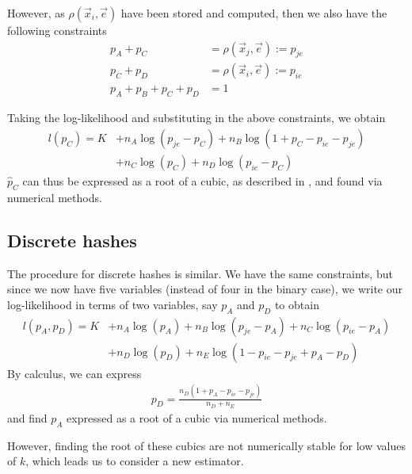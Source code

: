 \documentclass[runningheads]{llncs}
\begin{document}
However, as $\rho(\vec{x}_i, \vec{e})$ have been stored and computed, then we also have the following constraints
\begin{align}
p_A + p_C &= \rho(\vec{x}_j, \vec{e}) := p_{je} \label{cs1} \\
p_C + p_D &= \rho(\vec{x}_i, \vec{e}) := p_{ie} \label{cs2} \\
p_A + p_B + p_C + p_D &= 1 \label{cs3}
\end{align}
        
        Taking the log-likelihood and substituting in the above constraints, we obtain
\begin{equation}
        \begin{split}
        l(p_C) = K &+ n_A \log(p_{je} - p_C) + n_B \log(1 + p_C - p_{ie} - p_{je}) \\
        &+ n_C \log(p_C) + n_D \log(p_{ie} - p_C) \label{binary_cubic}
        \end{split}
\end{equation}
$\hat{p}_C$ can thus be expressed as a root of a cubic, as described in \cite{kang2018improving}, and found via numerical methods.

\subsection{Discrete hashes}
        The procedure for discrete hashes is similar. We have the same constraints, but since we now have five variables (instead of four in the binary case), we write our log-likelihood in terms of two variables, say $p_A$ and $p_D$ to obtain
        \begin{equation}
        \begin{split}
            l(p_A, p_D) = K &+ n_A \log(p_A) + n_B \log(p_{je}-p_A) + n_C \log(p_{ie} - p_A) \\
            &+ n_D \log(p_D) + n_E \log(1 - p_{ie} - p_{je} + p_A - p_D)
        \end{split} \label{discrete_cubic}
        \end{equation}
By calculus, we can express
\begin{align}
        p_D = \frac{n_D(1 + p_A - p_{ie} - p_{je})}{n_D + n_E}
\end{align}
and find $p_A$ expressed as a root of a cubic via numerical methods.

However, finding the root of these cubics are not numerically stable for low values of $k$, which leads us to consider a new estimator.
\end{document}
